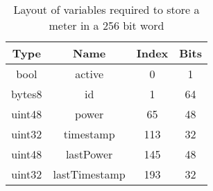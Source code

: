 \begin{table}[htb]
	\centering
	\vspace*{-1ex}
	\scriptsize
	\vspace{-1ex}
	\caption{Layout of variables required to store a meter in a 256 bit word}
	\begin{tabular}{|c|c|c|c|}
        \hline
        \textbf{Type} &     \textbf{Name}    & \textbf{Index} & \textbf{Bits} \\ \hline 
            bool      &     active           &    0           &      1  \\
            bytes8    &     id               &    1           &      64 \\
            uint48    &     power            &    65          &      48 \\
            uint32    &     timestamp        &    113         &      32 \\
            uint48    &     lastPower        &    145         &      48 \\
            uint32    &     lastTimestamp    &    193         &      32 \\
        \hline
    \end{tabular}
    \label{table:meterlayout}
\end{table}
